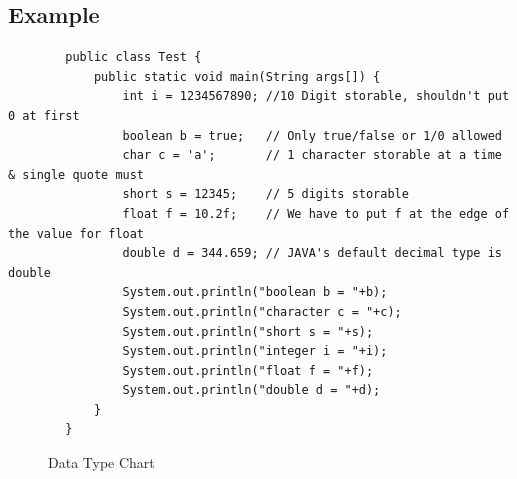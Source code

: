 \documentclass[openany]{book}  %
\begin{document}
\subsection{Example}
\begin{center}
    \footnotesize
    \begin{verbatim}
        public class Test {
            public static void main(String args[]) {
                int i = 1234567890; //10 Digit storable, shouldn't put 0 at first
                boolean b = true;   // Only true/false or 1/0 allowed
                char c = 'a';       // 1 character storable at a time & single quote must
                short s = 12345;    // 5 digits storable
                float f = 10.2f;    // We have to put f at the edge of the value for float
                double d = 344.659; // JAVA's default decimal type is double
                System.out.println("boolean b = "+b);
                System.out.println("character c = "+c);
                System.out.println("short s = "+s);
                System.out.println("integer i = "+i);
                System.out.println("float f = "+f);
                System.out.println("double d = "+d);
            }
        }
    \end{verbatim}
\end{center}
% 
% 
\begin{figure}[htbp]
    \begin{center}
        \caption{Data Type Chart\cite{Ref3}}
    \end{center}
\end{figure}

% 
% 
\end{document}
